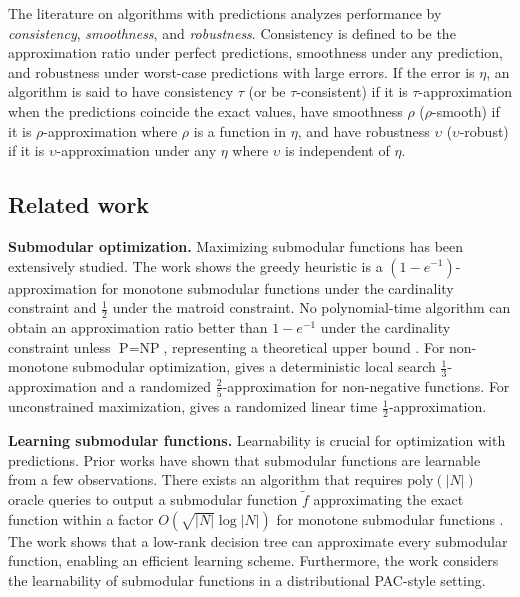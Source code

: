The literature on algorithms with predictions analyzes performance by \textit{consistency}, \textit{smoothness}, and \textit{robustness}. Consistency is defined to be the approximation ratio under perfect predictions, smoothness under any prediction, and robustness under worst-case predictions with large errors. If the error is $\eta$, an algorithm is said to have consistency $\tau$ (or be $\tau$-consistent) if it is $\tau$-approximation when the predictions coincide the exact values, have smoothness $\rho$ ($\rho$-smooth) if it is $\rho$-approximation where $\rho$ is a function in $\eta$, and have robustness $\upsilon$ ($\upsilon$-robust) if it is $\upsilon$-approximation under any $\eta$ where $\upsilon$ is independent of $\eta$. 


\subsection{Related work}

\noindent \textbf{Submodular optimization.} Maximizing submodular functions has been extensively studied. The work \cite{greedySubmodularFunctions} shows the greedy heuristic is a $(1 - e^{-1})$-approximation for monotone submodular functions under the cardinality constraint and $\frac{1}{2}$ under the matroid constraint. No polynomial-time algorithm can obtain an approximation ratio better than $1 - e^{-1}$ under the cardinality constraint unless $\text{P}=\text{NP}$, representing a theoretical upper bound \cite{setCoverisHard}. For non-monotone submodular optimization, \cite{maximizingNonMonotoneSubmodularFunctions} gives a deterministic local search $\frac{1}{3}$-approximation and a randomized $\frac{2}{5}$-approximation for non-negative functions. For unconstrained maximization, \cite{linearTimeApproximationForUnconstrainedSubmodular} gives a randomized linear time $\frac{1}{2}$-approximation. 


\noindent \textbf{Learning submodular functions.} Learnability is crucial for optimization with predictions. Prior works have shown that submodular functions are learnable from a few observations. %
There exists an algorithm that requires $\text{poly}(|N|)$ oracle queries to output a submodular function $\tilde{f}$ approximating the exact function within a factor $O(\sqrt{|N|}\log |N|)$ for monotone submodular functions \cite{approxSubmodularFunctions}. 
The work \cite{representationApproxLearnSubmodularFunctions} shows that a low-rank decision tree can approximate every submodular function, enabling an efficient learning scheme. 
Furthermore, the work \cite{submodularFunctionsLearn} considers the learnability of submodular functions in a distributional PAC-style setting. 


